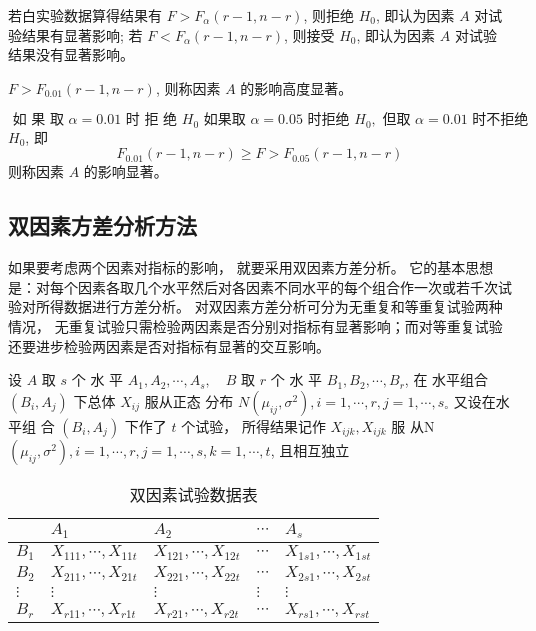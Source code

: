 若白实验数据算得结果有 $  {F}>{F}_{{\alpha}}({r}-{1}, {n}-{r})  $, 则拒绝 $  {H}_{0}  $, 即认为因素 $  {A}  $ 对试验结果有显著影响; 若 $  {F}<{F}_{\alpha}({r}-{1}, {n}-{r})  $, 则接受 $  {H}_{{0}}  $, 即认为因素 $  {A}  $ 对试验
结果没有显著影响。 

$  F>F_{0.01}(r-1, n-r)  $, 则称因素 $  A  $ 的影响高度显著。 

$\text { 如 果 取 } \alpha={0 . 0 1} \text { 时 拒 绝 } {H}_{{0}}
\text { 如果取 } \alpha=0.05 \text { 时拒绝 } {H}_{0}, \text { 但取 } \alpha=0.01 \text { 时不拒绝 }$
$  {H}_{{0}}  $, 即
\begin{equation}
F_{0.01}(r-1, n-r) \geq F>F_{0.05}(r-1, n-r)
\end{equation}
则称因素 $  {A}  $ 的影响显著。 

\subsection{双因素方差分析方法}

如果要考虑两个因素对指标的影响， 就要采用双因素方差分析。 它的基本思想是：对每个因素各取几个水平然后对各因素不同水平的每个组合作一次或若千次试验对所得数据进行方差分析。 对双因素方差分析可分为无重复和等重复试验两种情况， 无重复试验只需检验两因素是否分别对指标有显著影响；而对等重复试验还要进步检验两因素是否对指标有显著的交互影响。 

设 $  {A}  $ 取 $  {s}  $ 个 水 平 $  {A}_{{1}}, {A}_{2}, \cdots, {A}_{s}, \quad {B}  $ 取 $  {r}  $ 个 水 平
$  {B}_{1}, {B}_{2}, \cdots, {B}_{r}  $, 在 水平组合 $  \left({B}_{i}, {A}_{j}\right)  $ 下总体 $  {X}_{i j}  $ 服从正态
分布 $  N\left(\mu_{i j}, \sigma^{2}\right), i=1, \cdots, r, j=1, \cdots, s_{\circ}  $ 又设在水平组
合 $  \left({B}_{i}, {A}_{j}\right)  $ 下作了 $  {t}  $ 个试验， 所得结果记作 $  {X}_{i j k}, {X}_{i j k}  $ 服
从N $  \left(\mu_{i j}, \sigma^{2}\right), i=1, \cdots, r, j=1, \cdots, s, k=1, \cdots, t  $, 且相互独立

\begin{table}
        \caption{双因素试验数据表}
        \begin{tabular}{l|llll}
        \hline & $  A_{1}  $ & $  A_{2}  $ & $  \cdots  $ & $  A_{s}  $ \\
        \hline $  {B}_{1}  $ & $  X_{111}, \cdots, X_{11 t}  $ & $  X_{121}, \cdots, X_{12 t}  $ & $  \cdots  $ & $  X_{1 s 1}, \cdots, X_{1 s t}  $ \\
        $  B_{2}  $ & $  X_{211}, \cdots, X_{21 t}  $ & $  X_{221}, \cdots, X_{22 t}  $ & $  \cdots  $ & $  X_{2 s 1}, \cdots, X_{2 s t}  $ \\
        $  \vdots  $ & $  \vdots  $ & $  \vdots  $ & $  \vdots  $ & $  \vdots  $ \\
        $  B_{r}  $ & $  X_{r 11}, \cdots, X_{r 1 t}  $ & $  X_{r 21}, \cdots, X_{r 2 t}  $ & $  \cdots  $ & $  X_{r s 1}, \cdots, X_{r s t}  $ \\
        \hline
        \end{tabular}
\end{table}

